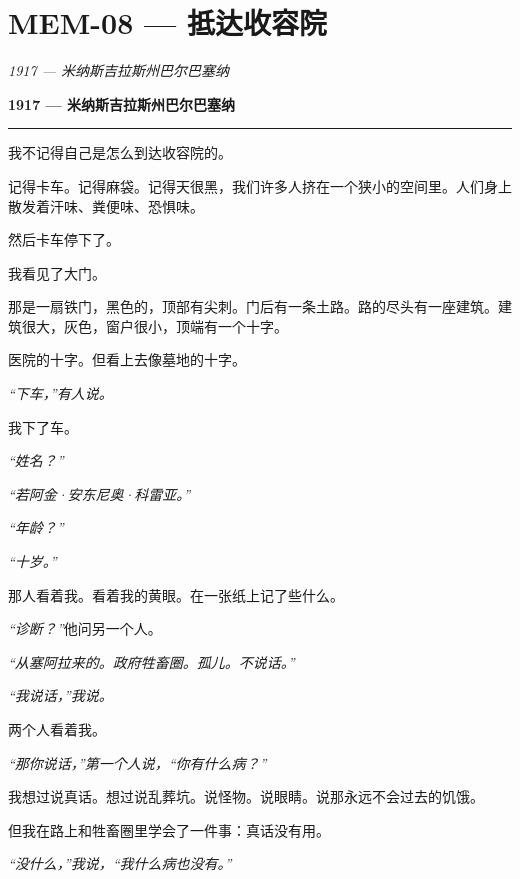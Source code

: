 \section*{\textbf{MEM-08} --- 抵达收容院}

\noindent \textit{1917 --- 米纳斯吉拉斯州巴尔巴塞纳}

\noindent \textbf{1917 --- 米纳斯吉拉斯州巴尔巴塞纳}

\vspace{0.5em}\noindent\rule{\textwidth}{0.5pt}\vspace{0.5em}

\noindent 我不记得自己是怎么到达收容院的。

\noindent 记得卡车。记得麻袋。记得天很黑，我们许多人挤在一个狭小的空间里。人们身上散发着汗味、粪便味、恐惧味。

\noindent 然后卡车停下了。

\noindent 我看见了大门。

\noindent 那是一扇铁门，黑色的，顶部有尖刺。门后有一条土路。路的尽头有一座建筑。建筑很大，灰色，窗户很小，顶端有一个十字。

\noindent 医院的十字。但看上去像墓地的十字。

\noindent \textit{“下车，”有人说。}

\noindent 我下了车。

\noindent \textit{“姓名？”}

\noindent \textit{“若阿金·安东尼奥·科雷亚。”}

\noindent \textit{“年龄？”}

\noindent \textit{“十岁。”}

\noindent 那人看着我。看着我的黄眼。在一张纸上记了些什么。

\noindent \textit{“诊断？”}他问另一个人。

\noindent \textit{“从塞阿拉来的。政府牲畜圈。孤儿。不说话。”}

\noindent \textit{“我说话，”我说。}

\noindent 两个人看着我。

\noindent \textit{“那你说话，”第一个人说，“你有什么病？”}

\noindent 我想过说真话。想过说乱葬坑。说怪物。说眼睛。说那永远不会过去的饥饿。

\noindent 但我在路上和牲畜圈里学会了一件事：真话没有用。

\noindent \textit{“没什么，”我说，“我什么病也没有。”}

